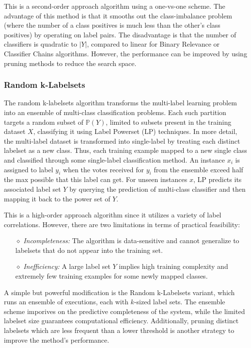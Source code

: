 \documentclass[12pt]{report}
\begin{document}
	This is a second-order approach algorithm using a one-vs-one scheme. The
  advantage of this method is that it smooths out the class-imbalance problem
  (where the number of a class positives is much less than the other's class
  positives) by operating on label pairs. The disadvantage is that the number of
  classifiers is quadratic to $|Y|$, compared to linear for Binary Relevance or
  Classifier Chains algorithms. However, the performance can be improved by
  using pruning methods to reduce the search space.
	
	\subsubsection*{Random k-Labelsets}
	The random k-labelsets algorithm transforms the multi-label learning problem
  into an ensemble of multi-class classification problems. Each such partition
  targets a random subset of $\mathbb{P}(Y)$, limited to subsets present in the
  training dataset $X$, classifying it using Label Powerset (LP) techniques. In
  more detail, the multi-label dataset is transformed into single-label by
  treating each distinct labelset as a new class. Thus, each training example
  mapped to a new single class and classified through some single-label
  classification method. An instance $x_i$ is assigned to label $y_i$ when the votes received for $y_i$ from the ensemble exceed half the max possible that this label can get. For unseen instances $x$, LP predicts its associated label set $Y$ by querying the prediction of multi-class classifier and then mapping it back to the power set of $Y$.
	
	This is a high-order approach algorithm since it utilizes a variety of label correlations. However, there are two limitations in terms of practical feasibility: 
	\begin{itemize}
		\item[$\diamond$] \emph{Incompleteness: }The algorithm is data-sensitive and cannot generalize to labelsets that do not appear into the training set.
		\item[$\diamond$] \emph{Inefficiency: }A large label set $Y$ implies high training complexity and extremely few training examples for some newly mapped classes.
	\end{itemize}

	A simple but powerful modification is the Random k-Labelsets variant, which
  runs an ensemble of executions, each with $k$-sized label sets. The ensemble
  scheme imporives on the predictive completeness of the system, while the
  limited labelset size guarantees computational efficiency. Additionally,
  pruning distinct labelsets which are less frequent than a lower threshold is
  another strategy to improve the method's performance.
	
\end{document}
